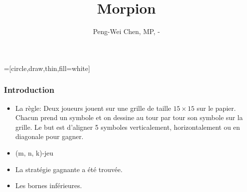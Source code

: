 \documentclass{beamer}
\title{Morpion}
\author{Peng-Wei Chen, MP, \oldstylenums{2017}-\oldstylenums{2018}}
\date{}
\begin{document}
=[circle,draw,thin,fill=white]

\begin{frame}
    \titlepage
\end{frame}

\begin{frame}
    \frametitle{Introduction}
    \begin{itemize}
        \item La règle:
Deux joueurs jouent sur une grille de taille $15 \times 15$ sur le papier. Chacun prend un symbole et on dessine au tour par tour son symbole sur la grille. Le but est d'aligner 5 symboles verticalement, horizontalement ou en diagonale pour gagner.
        \pause
        \item (m, n, k)-jeu
        \pause
        \item La stratégie gagnante a été trouvée.
        
        \pause
        \item Les bornes inférieures.
    \end{itemize}
    
\end{frame}
\end{document}
